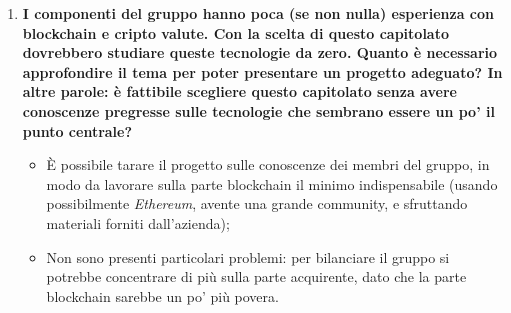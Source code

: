 \documentclass[11pt]{article}
\begin{document}
\begin{enumerate}
				\bigskip
				
				\item \textbf{I componenti del gruppo hanno poca (se non nulla) esperienza con blockchain e cripto valute.
				Con la scelta di questo capitolato dovrebbero studiare queste tecnologie da zero.
				Quanto è necessario approfondire il tema per poter presentare un progetto adeguato?
				In altre parole: è fattibile scegliere questo capitolato senza avere conoscenze pregresse sulle tecnologie
				che sembrano essere un po' il punto centrale?}
				
				\medskip
				
				\begin{itemize}
					\item È possibile tarare il progetto sulle conoscenze dei membri del gruppo, in modo da lavorare sulla parte blockchain
					il minimo indispensabile (usando possibilmente \textit{Ethereum}, avente una grande community, e sfruttando
					materiali forniti dall'azienda);
					\item Non sono presenti particolari problemi: per bilanciare il gruppo si potrebbe concentrare di più sulla
					parte acquirente, dato che la parte blockchain sarebbe un po' più povera.
				\end{itemize}
			\end{enumerate}
\end{document}
